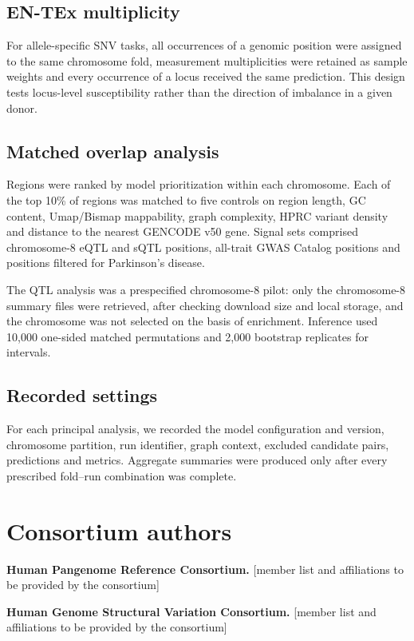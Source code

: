 \documentclass[11pt]{article}
\newcommand{\authorinput}[1]{\textcolor{red!70!black}{[#1]}}
\begin{document}
\begin{bibunit}[unsrtnat]
\subsection{EN-TEx multiplicity}
For allele-specific SNV tasks, all occurrences of a genomic position were assigned to the same chromosome fold, measurement multiplicities were retained as sample weights and every occurrence of a locus received the same prediction. This design tests locus-level susceptibility rather than the direction of imbalance in a given donor.

\subsection{Matched overlap analysis}
Regions were ranked by model prioritization within each chromosome. Each of the top 10\% of regions was matched to five controls on region length, GC content, Umap/Bismap mappability\cite{supp__karimzadeh2018umap}, graph complexity, HPRC variant density and distance to the nearest GENCODE v50 gene\cite{supp__frankish2023gencode}. Signal sets comprised chromosome-8 eQTL and sQTL positions\cite{supp__lappalainen2013transcriptome}, all-trait GWAS Catalog positions and positions filtered for Parkinson's disease\cite{supp__sollis2023gwas}.

The QTL analysis was a prespecified chromosome-8 pilot: only the chromosome-8 summary files were retrieved, after checking download size and local storage, and the chromosome was not selected on the basis of enrichment. Inference used 10,000 one-sided matched permutations and 2,000 bootstrap replicates for intervals.

\subsection{Recorded settings}
For each principal analysis, we recorded the model configuration and version, chromosome partition, run identifier, graph context, excluded candidate pairs, predictions and metrics. Aggregate summaries were produced only after every prescribed fold--run combination was complete.

\section*{Consortium authors}
\noindent\textbf{Human Pangenome Reference Consortium.} \authorinput{member list and affiliations to be provided by the consortium}

\noindent\textbf{Human Genome Structural Variation Consortium.} \authorinput{member list and affiliations to be provided by the consortium}

\FloatBarrier
\begingroup
\small
\renewcommand{\refname}{Supplementary references}
\putbib[references]

\endgroup
\end{bibunit}
\end{document}
